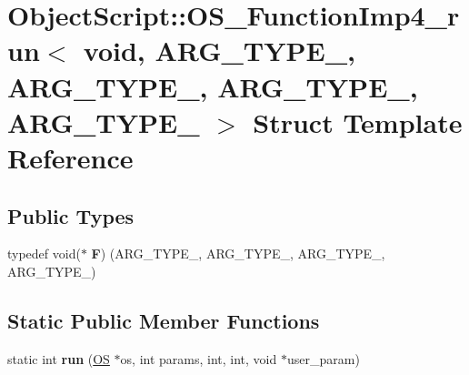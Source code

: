 \hypertarget{struct_object_script_1_1_o_s___function_imp4__run_3_01void_00_01_01_01_a_r_g___t_y_p_e__1_00_01_2fef7927fc7315dd0d2c783142f5ead9}{}\section{Object\+Script\+:\+:O\+S\+\_\+\+Function\+Imp4\+\_\+run$<$ void, A\+R\+G\+\_\+\+T\+Y\+P\+E\+\_, A\+R\+G\+\_\+\+T\+Y\+P\+E\+\_, A\+R\+G\+\_\+\+T\+Y\+P\+E\+\_, A\+R\+G\+\_\+\+T\+Y\+P\+E\+\_ $>$ Struct Template Reference}
\label{struct_object_script_1_1_o_s___function_imp4__run_3_01void_00_01_01_01_a_r_g___t_y_p_e__1_00_01_2fef7927fc7315dd0d2c783142f5ead9}
\subsection*{Public Types}
\begin{DoxyCompactItemize}
\item 
typedef void($\ast$ {\bfseries F}) (A\+R\+G\+\_\+\+T\+Y\+P\+E\+\_, A\+R\+G\+\_\+\+T\+Y\+P\+E\+\_, A\+R\+G\+\_\+\+T\+Y\+P\+E\+\_, A\+R\+G\+\_\+\+T\+Y\+P\+E\+\_)\hypertarget{struct_object_script_1_1_o_s___function_imp4__run_3_01void_00_01_01_01_a_r_g___t_y_p_e__1_00_01_2fef7927fc7315dd0d2c783142f5ead9_aa5a5c21cc5d4b209541672390afe6c6a}{}\label{struct_object_script_1_1_o_s___function_imp4__run_3_01void_00_01_01_01_a_r_g___t_y_p_e__1_00_01_2fef7927fc7315dd0d2c783142f5ead9_aa5a5c21cc5d4b209541672390afe6c6a}

\end{DoxyCompactItemize}
\subsection*{Static Public Member Functions}
\begin{DoxyCompactItemize}
\item 
static int {\bfseries run} (\hyperlink{class_object_script_1_1_o_s}{OS} $\ast$os, int params, int, int, void $\ast$user\+\_\+param)\hypertarget{struct_object_script_1_1_o_s___function_imp4__run_3_01void_00_01_01_01_a_r_g___t_y_p_e__1_00_01_2fef7927fc7315dd0d2c783142f5ead9_a3f81e9cb697abd5697c56969f8d65ced}{}\label{struct_object_script_1_1_o_s___function_imp4__run_3_01void_00_01_01_01_a_r_g___t_y_p_e__1_00_01_2fef7927fc7315dd0d2c783142f5ead9_a3f81e9cb697abd5697c56969f8d65ced}

\end{DoxyCompactItemize}


